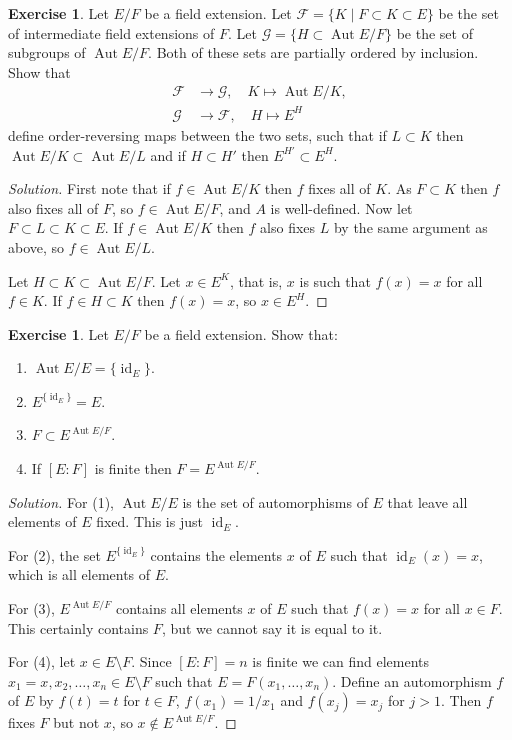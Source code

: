 \documentclass[11pt]{amsart}
\theoremstyle{definition}
\newtheorem{e}[theo]{Exercise}
\newenvironment{s}{\begin{proof}[Solution]}{\end{proof}}
\newcommand{\cc}[1]{\mathcal{#1}}
\DeclareMathOperator{\id}{id}
\DeclareMathOperator{\Aut}{Aut}
\begin{document}
\begin{e}
Let $E/F$ be a field extension.
Let $\cc F = \{ K \mid F \subset K \subset E \}$ be the set of intermediate field extensions of $F$.
Let $\cc G = \{ H \subset \Aut E/F \}$ be the set of subgroups of $\Aut E/F$.
Both of these sets are partially ordered by inclusion.
Show that
\begin{align*}
\cc F &\to \cc G,
\quad
K \mapsto \Aut E/K, 
\\
\cc G &\to \cc F,
\quad
H \mapsto E^H
\end{align*}
define order-reversing maps between the two sets, such that if $L \subset K$ then $\Aut E/K \subset \Aut E/L$ and if $H \subset H'$ then $E^{H'} \subset E^H$.
\end{e}

\begin{s}
First note that if $f \in \Aut E/K$ then $f$ fixes all of $K$.
As $F \subset K$ then $f$ also fixes all of $F$, so $f \in \Aut E/F$, and $A$ is well-defined.
Now let $F \subset L \subset K \subset E$.
If $f \in \Aut E/K$ then $f$ also fixes $L$ by the same argument as above, so $f \in \Aut E/L$.

Let $H \subset K \subset \Aut E/F$.
Let $x \in E^K$, that is, $x$ is such that $f(x) = x$ for all $f \in K$.
If $f \in H \subset K$ then $f(x) = x$, so $x \in E^H$.
\end{s}


\begin{e}
Let $E/F$ be a field extension.
Show that:
\begin{enumerate}
\item
$\Aut E/E = \{ \id_E \}$.

\item
$E^{\{\id_E\}} = E$.

\item
$F \subset E^{\Aut E/F}$.

\item
If $[E:F]$ is finite then $F = E^{\Aut E/F}$.
\end{enumerate}
\end{e}

\begin{s}
For (1), $\Aut E/E$ is the set of automorphisms of $E$ that leave all elements of $E$ fixed.
This is just $\id_E$.

For (2), the set $E^{\{\id_E\}}$ contains the elements $x$ of $E$ such that $\id_E(x) = x$, which is all elements of $E$.

For (3), $E^{\Aut E/F}$ contains all elements $x$ of $E$ such that $f(x) = x$ for all $x \in F$.
This certainly contains $F$, but we cannot say it is equal to it.

For (4), let $x \in E \setminus F$.
Since $[E:F] = n$ is finite we can find elements $x_1 = x, x_2, \ldots, x_n \in E \setminus F$ such that $E = F(x_1, \ldots, x_n)$.
Define an automorphism $f$ of $E$ by $f(t) = t$ for $t \in F$, $f(x_1) = 1/x_1$ and $f(x_j) = x_j$ for $j > 1$.
Then $f$ fixes $F$ but not $x$, so $x \not\in E^{\Aut E/F}$.
\end{s}
\end{document}
